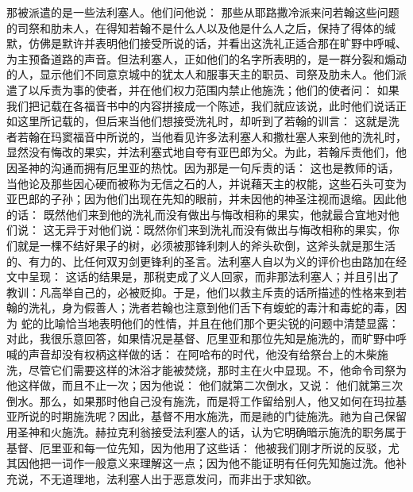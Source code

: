 那被派遣的是一些法利塞人。他们问他说：  那些从耶路撒冷派来问若翰这些问题的司祭和肋未人，在得知若翰不是什么人以及他是什么人之后，保持了得体的缄默，仿佛是默许并表明他们接受所说的话，并看出这洗礼正适合那在旷野中呼喊、为主预备道路的声音。但法利塞人，正如他们的名字所表明的，是一群分裂和煽动的人，显示他们不同意京城中的犹太人和服事天主的职员、司祭及肋未人。他们派遣了以斥责为事的使者，并在他们权力范围内禁止他施洗；他们的使者问： 如果我们把记载在各福音书中的内容拼接成一个陈述，我们就应该说，此时他们说话正如这里所记载的，但后来当他们想接受洗礼时，却听到了若翰的训言：  这就是洗者若翰在玛窦福音中所说的，当他看见许多法利塞人和撒杜塞人来到他的洗礼时，显然没有悔改的果实，并法利塞式地自夸有亚巴郎为父。为此，若翰斥责他们，他因圣神的沟通而拥有厄里亚的热忱。因为那是一句斥责的话： 这也是教师的话，当他论及那些因心硬而被称为无信之石的人，并说藉天主的权能，这些石头可变为亚巴郎的子孙；因为他们出现在先知的眼前，并未因他的神圣注视而退缩。因此他的话： 既然他们来到他的洗礼而没有做出与悔改相称的果实，他就最合宜地对他们说： 这无异于对他们说：既然你们来到洗礼而没有做出与悔改相称的果实，你们就是一棵不结好果子的树，必须被那锋利刺人的斧头砍倒，这斧头就是那生活的、有力的、比任何双刃剑更锋利的圣言。法利塞人自以为义的评价也由路加在经文中呈现：  这话的结果是，那税吏成了义人回家，而非那法利塞人；并且引出了教训：凡高举自己的，必被贬抑。于是，他们以救主斥责的话所描述的性格来到若翰的洗礼，身为假善人；洗者若翰也注意到他们舌下有蝮蛇的毒汁和毒蛇的毒，因为 蛇的比喻恰当地表明他们的性情，并且在他们那个更尖锐的问题中清楚显露： 对此，我很乐意回答，如果情况是基督、厄里亚和那位先知是施洗的，而旷野中呼喊的声音却没有权柄这样做的话： 在阿哈布的时代，他没有给祭台上的木柴施洗，尽管它们需要这样的沐浴才能被焚烧，那时主在火中显现。不，他命令司祭为他这样做，而且不止一次；因为他说： 他们就第二次倒水，又说： 他们就第三次倒水。那么，如果那时他自己没有施洗，而是将工作留给别人，他又如何在玛拉基亚所说的时期施洗呢？因此，基督不用水施洗，而是祂的门徒施洗。祂为自己保留用圣神和火施洗。赫拉克利翁接受法利塞人的话，认为它明确暗示施洗的职务属于基督、厄里亚和每一位先知，因为他用了这些话： 他被我们刚才所说的反驳，尤其因他把一词作一般意义来理解这一点；因为他不能证明有任何先知施过洗。他补充说，不无道理地，法利塞人出于恶意发问，而非出于求知欲。\par

